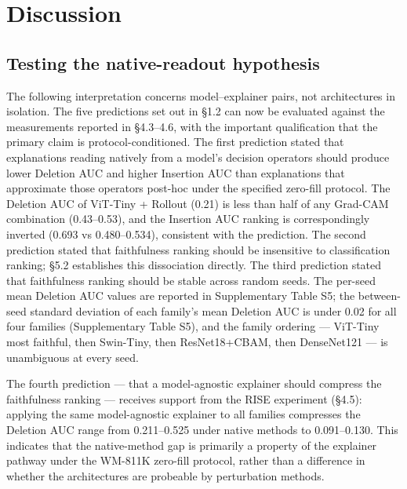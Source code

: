 \documentclass[11pt,a4paper]{article}
\begin{document}
\section{Discussion}

\subsection{Testing the native-readout hypothesis}

The following interpretation concerns model--explainer pairs, not architectures in isolation. The five predictions set out in \S{}1.2 can now be evaluated against the measurements reported in \S{}4.3--4.6, with the important qualification that the primary claim is protocol-conditioned. The first prediction stated that explanations reading natively from a model's decision operators should produce lower Deletion AUC and higher Insertion AUC than explanations that approximate those operators post-hoc under the specified zero-fill protocol. The Deletion AUC of ViT-Tiny + Rollout (0.21) is less than half of any Grad-CAM combination (0.43--0.53), and the Insertion AUC ranking is correspondingly inverted (0.693 vs 0.480--0.534), consistent with the prediction. The second prediction stated that faithfulness ranking should be insensitive to classification ranking; \S{}5.2 establishes this dissociation directly. The third prediction stated that faithfulness ranking should be stable across random seeds. The per-seed
mean Deletion AUC values are reported in Supplementary Table S5; the between-seed standard deviation of each family's mean Deletion AUC is under 0.02 for all four families (Supplementary Table S5), and the family ordering --- ViT-Tiny most faithful, then Swin-Tiny, then ResNet18+CBAM, then DenseNet121 --- is unambiguous at every seed.

The fourth prediction --- that a model-agnostic explainer should compress the faithfulness ranking --- receives support from the RISE experiment (\S{}4.5): applying the same model-agnostic explainer to all families compresses the Deletion AUC range from 0.211--0.525 under native methods to 0.091--0.130. This indicates that the native-method gap is primarily a property of the explainer pathway under the WM-811K zero-fill protocol, rather than a difference in whether the architectures are probeable by perturbation methods.
\end{document}
